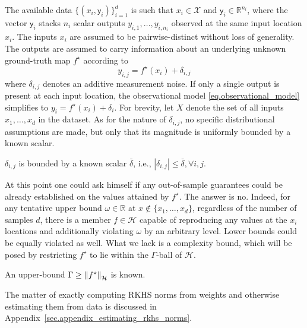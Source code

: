 The available data $\{(x_i,\mathsf{y}_i)\}_{i=1}^d$ is such that $x_i \in \mathcal{X}$ and $\mathsf{y}_i \in \mathbb{R}^{n_i}$, where the vector $\mathsf{y}_i$ stacks $n_i$ scalar outputs $y_{i,1}, \dots, y_{i,n_i}$ observed at the same input location $x_i$. The inputs $x_i$ are assumed to be pairwise-distinct without loss of generality. The outputs are assumed to carry information about an underlying unknown ground-truth map $f^\star$ according to
\begin{equation}
	\label{eq.observational_model}
	y_{i,j} = f^\star(x_i) + \delta_{i,j}
\end{equation}
where $\delta_{i,j}$ denotes an additive measurement noise. If only a single output is present at each input location, the observational model \eqref{eq.observational_model} simplifies to $y_{i} = f^\star(x_i) + \delta_{i}$. For brevity, let $X$ denote the set of all inputs $x_1,\dots,x_d$ in the dataset. As for the nature of $\delta_{i,j}$, no specific distributional assumptions are made, but only that its magnitude is uniformly bounded by a known scalar.

\begin{assumption}
	\label{as:noisebound}
	$\delta_{i,j}$ is bounded by a known scalar $\bar{\delta}$, i.e., $|\delta_{i,j}| \leq \bar \delta, \forall i,j$.
\end{assumption}

At this point one could ask himself if any out-of-sample guarantees could be already established on the values attained by $f^\star$. The answer is no. Indeed, for any tentative upper bound $\omega \in \mathbb{R}$ at $x \not \in \{x_1,\dots,x_d\}$, regardless of the number of samples $d$, there is a member $f \in \mathcal{H}$ capable of reproducing any values at the $x_i$ locations and additionally violating $\omega$ by an arbitrary level. Lower bounds could be equally violated as well. What we lack is a complexity bound, which will be posed by restricting $f^\star$ to lie within the $\Gamma$-ball of $\mathcal{H}$.

\begin{assumption}
	\label{as.norm_bound}
	An upper-bound $\Gamma \geq \left\| f^\star \right\|_\mathcal{H}$ is known.
\end{assumption}

\begin{remark}
	The matter of exactly computing RKHS norms from weights and otherwise estimating them from data is discussed in Appendix~\ref{sec.appendix_estimating_rkhs_norms}.
\end{remark}

